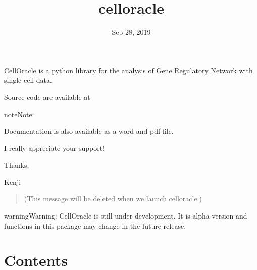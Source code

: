 \documentclass[letterpaper,10pt,english]{sphinxmanual}
\title{celloracle}
\date{Sep 28, 2019}
\author{}
\begin{document}
\maketitle
\sphinxtableofcontents
{}\label{\detokenize{index::doc}}


CellOracle is a python library for the analysis of Gene Regulatory Network with single cell data.

Source code are available at 

\begin{sphinxadmonition}{note}{Note:}
\begin{DUlineblock}{0em}
\item[] 
\item[] 
\end{DUlineblock}

\begin{DUlineblock}{0em}
\item[] Documentation is also available as a word and pdf file.
\end{DUlineblock}



\begin{DUlineblock}{0em}
\item[] 
\item[] I really appreciate your support!
\item[] 
\item[] Thanks,
\item[] Kenji
\end{DUlineblock}
\begin{quote}

(This message will be deleted when we launch celloracle.)
\end{quote}
\end{sphinxadmonition}

\begin{sphinxadmonition}{warning}{Warning:}
CellOracle is still under development. It is alpha version and functions in this package may change in the future release.
\end{sphinxadmonition}


\chapter{Contents}
\label{\detokenize{index:contents}}
\end{document}
